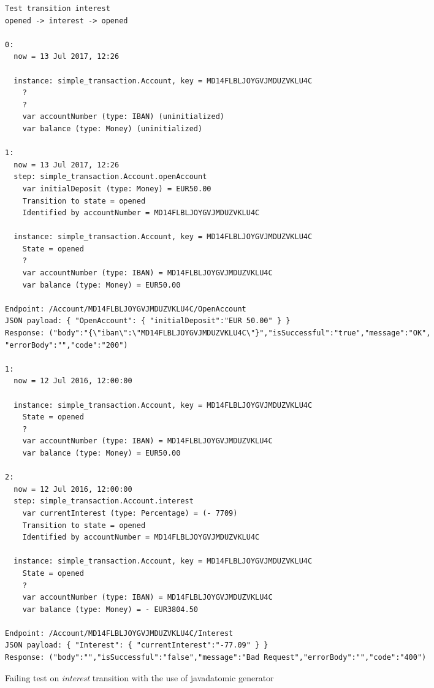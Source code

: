 \begin{sourcecode}[h!]
\begin{lstlisting}[]
Test transition interest
opened -> interest -> opened

0:
  now = 13 Jul 2017, 12:26

  instance: simple_transaction.Account, key = MD14FLBLJOYGVJMDUZVKLU4C
    ?
    ?
    var accountNumber (type: IBAN) (uninitialized)
    var balance (type: Money) (uninitialized)

1:
  now = 13 Jul 2017, 12:26
  step: simple_transaction.Account.openAccount
    var initialDeposit (type: Money) = EUR50.00
    Transition to state = opened
    Identified by accountNumber = MD14FLBLJOYGVJMDUZVKLU4C

  instance: simple_transaction.Account, key = MD14FLBLJOYGVJMDUZVKLU4C
    State = opened
    ?
    var accountNumber (type: IBAN) = MD14FLBLJOYGVJMDUZVKLU4C
    var balance (type: Money) = EUR50.00

Endpoint: /Account/MD14FLBLJOYGVJMDUZVKLU4C/OpenAccount
JSON payload: { "OpenAccount": { "initialDeposit":"EUR 50.00" } }
Response: ("body":"{\"iban\":\"MD14FLBLJOYGVJMDUZVKLU4C\"}","isSuccessful":"true","message":"OK",
"errorBody":"","code":"200")

1:
  now = 12 Jul 2016, 12:00:00

  instance: simple_transaction.Account, key = MD14FLBLJOYGVJMDUZVKLU4C
    State = opened
    ?
    var accountNumber (type: IBAN) = MD14FLBLJOYGVJMDUZVKLU4C
    var balance (type: Money) = EUR50.00

2:
  now = 12 Jul 2016, 12:00:00
  step: simple_transaction.Account.interest
    var currentInterest (type: Percentage) = (- 7709)
    Transition to state = opened
    Identified by accountNumber = MD14FLBLJOYGVJMDUZVKLU4C

  instance: simple_transaction.Account, key = MD14FLBLJOYGVJMDUZVKLU4C
    State = opened
    ?
    var accountNumber (type: IBAN) = MD14FLBLJOYGVJMDUZVKLU4C
    var balance (type: Money) = - EUR3804.50

Endpoint: /Account/MD14FLBLJOYGVJMDUZVKLU4C/Interest
JSON payload: { "Interest": { "currentInterest":"-77.09" } }
Response: ("body":"","isSuccessful":"false","message":"Bad Request","errorBody":"","code":"400")
\end{lstlisting}
\caption{Failing test on \textit{interest} transition with the use of javadatomic generator}\label{fig:result-javadatomic-interest}
\end{sourcecode}
\FloatBarrier


